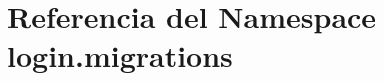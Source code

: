 \hypertarget{namespacelogin_1_1migrations}{}\section{Referencia del Namespace login.\+migrations}
\label{namespacelogin_1_1migrations}
